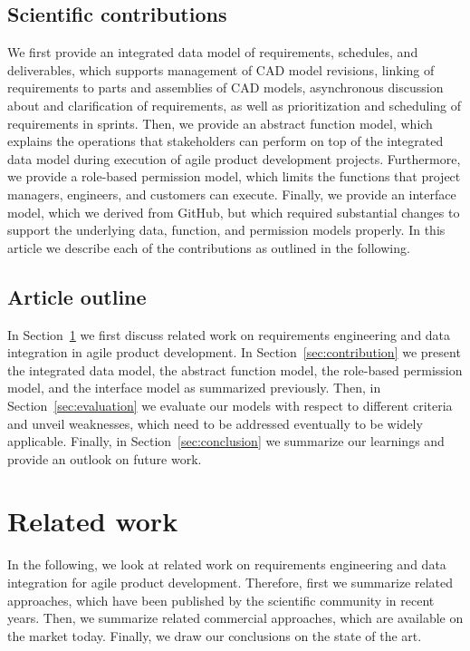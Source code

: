     \subsection*{Scientific contributions}
    We first provide an integrated data model of requirements, schedules, and deliverables, which supports management of CAD model revisions, linking of requirements to parts and assemblies of CAD models, asynchronous discussion about and clarification of requirements, as well as prioritization and scheduling of requirements in sprints.
    Then, we provide an abstract function model, which explains the operations that stakeholders can perform on top of the integrated data model during execution of agile product development projects.
    Furthermore, we provide a role-based permission model, which limits the functions that project managers, engineers, and customers can execute.
    Finally, we provide an interface model, which we derived from GitHub, but which required substantial changes to support the underlying data, function, and permission models properly.
    In this article we describe each of the contributions as outlined in the following.

    \subsection*{Article outline}
    In Section~\ref{sec:differentiation} we first discuss related work on requirements engineering and data integration in agile product development.
    In Section~\ref{sec:contribution} we present the integrated data model, the abstract function model, the role-based permission model, and the interface model as summarized previously.
    Then, in Section~\ref{sec:evaluation} we evaluate our models with respect to different criteria and unveil weaknesses, which need to be addressed eventually to be widely applicable.
    Finally, in Section~\ref{sec:conclusion} we summarize our learnings and provide an outlook on future work.
    
    \section{Related work}
    \label{sec:differentiation}
    In the following, we look at related work on requirements engineering and data integration for agile product development. Therefore, first we summarize related approaches, which have been published by the scientific community in recent years. Then, we summarize related commercial approaches, which are available on the market today. Finally, we draw our conclusions on the state of the art.

